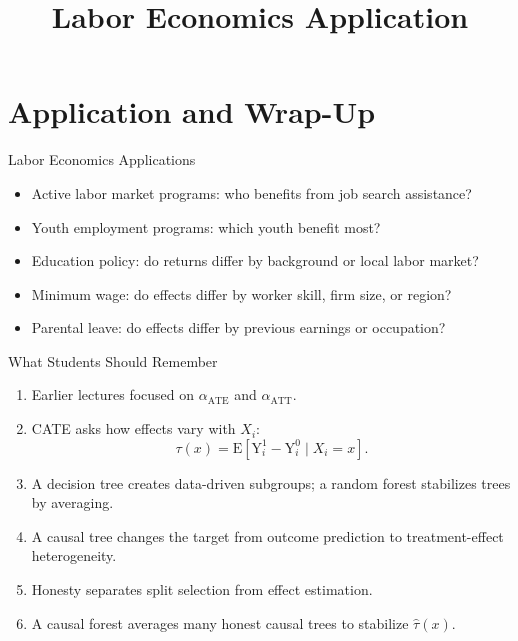 \documentclass[hyperref={pdfpagelabels=false}]{beamer}
\begin{document}
\title[]
{Labor Economics Application}

\subtitle{}
\author{}
\institute{}
\date{}

\begin{frame}{}
  \titlepage
\end{frame}

\section{Application and Wrap-Up}

\begin{frame}{Labor Economics Applications}
\begin{itemize}
  \item Active labor market programs: who benefits from job search assistance?
  \vspace{0.2cm}
  \item Youth employment programs: which youth benefit most?
  \vspace{0.2cm}
  \item Education policy: do returns differ by background or local labor market?
  \vspace{0.2cm}
  \item Minimum wage: do effects differ by worker skill, firm size, or region?
  \vspace{0.2cm}
  \item Parental leave: do effects differ by previous earnings or occupation?
\end{itemize}
\end{frame}

\begin{frame}{What Students Should Remember}
\begin{enumerate}
  \item Earlier lectures focused on $\alpha_{\text{ATE}}$ and $\alpha_{\text{ATT}}$.
  \vspace{0.2cm}
  \item CATE asks how effects vary with $X_i$:
  \[
    \tau(x)=\mathrm{E}\!\left[\mathrm{Y}^{1}_{i}-\mathrm{Y}^{0}_{i}\mid X_i=x\right].
  \]
  \vspace{0.2cm}
  \item A decision tree creates data-driven subgroups; a random forest stabilizes trees by averaging.
  \vspace{0.2cm}
  \item A causal tree changes the target from outcome prediction to treatment-effect heterogeneity.
  \vspace{0.2cm}
  \item Honesty separates split selection from effect estimation.
  \vspace{0.2cm}
  \item A causal forest averages many honest causal trees to stabilize $\hat{\tau}(x)$.
\end{enumerate}
\end{frame}
\end{document}
